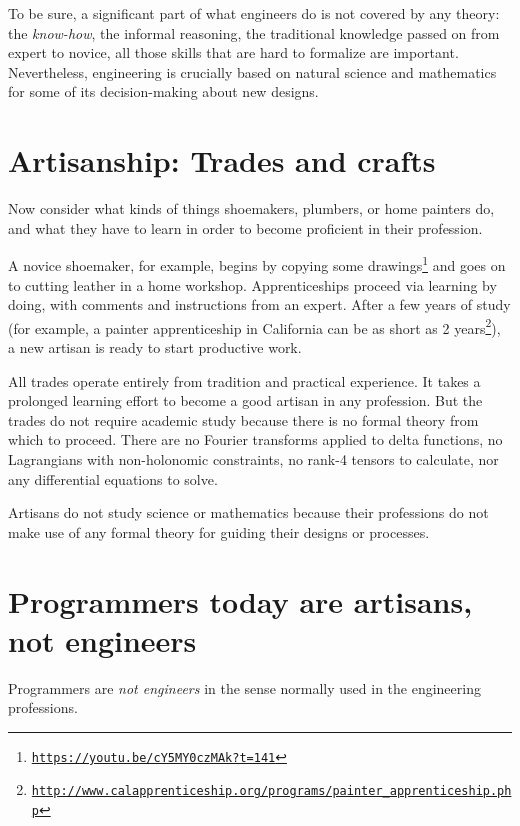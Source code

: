 To be sure, a significant part of what engineers do is not covered
by any theory: the \emph{know-how}, the informal reasoning, the traditional
knowledge passed on from expert to novice,  \textemdash{} all those
skills that are hard to formalize are important. Nevertheless, engineering
is crucially based on natural science and mathematics for some of
its decision-making about new designs.

\section{Artisanship: Trades and crafts }

Now consider what kinds of things shoemakers, plumbers, or home painters
do, and what they have to learn in order to become proficient in their
profession.

A novice shoemaker, for example, begins by copying some drawings\footnote{\texttt{\href{https://youtu.be/cY5MY0czMAk?t=141}{https://youtu.be/cY5MY0czMAk?t=141}}}
and goes on to cutting leather in a home workshop. Apprenticeships
proceed via learning by doing, with comments and instructions from
an expert. After a few years of study (for example, a painter apprenticeship
in California can be as short as 2 years\footnote{\texttt{\href{http://www.calapprenticeship.org/programs/painter_apprenticeship.php}{http://www.calapprenticeship.org/programs/painter\_apprenticeship.php}}}),
a new artisan is ready to start productive work. 

All trades operate entirely from tradition and practical experience.
It takes a prolonged learning effort to become a good artisan in any
profession. But the trades do not require academic study because there
is no formal theory from which to proceed. There are no Fourier transforms
applied to delta functions, no Lagrangians with non-holonomic constraints,
no rank-4 tensors to calculate, nor any differential equations to
solve.

Artisans do not study science or mathematics because their professions
do not make use of any formal theory for guiding their designs or
processes.

\section{Programmers today are artisans, not engineers }

Programmers are \emph{not engineers} in the sense normally used in
the engineering professions.


